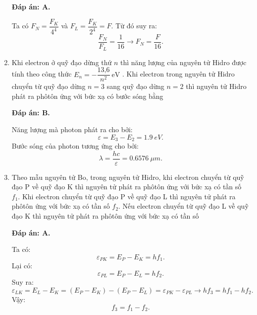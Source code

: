 \begin{enumerate}[label=\bfseries Câu \arabic*:]
	\loigiai
	{		\textbf{Đáp án: A.}
		
Ta có $ F_{N} = \dfrac{F_{K}}{4^{4}} $ và $ F_{L} = \dfrac{F_{K}}{2^{4}} = F $. Từ đó suy ra:
$$
	\dfrac{F_{N}}{F_{L}} = \dfrac{1}{16} \rightarrow F_{N} = \dfrac{F}{16}.
$$
		
	}
	
	\item {} 
		\cauhoi
	{Khi electron ở quỹ đạo dừng thứ $n$ thì năng lượng của nguyên tử Hidro được tính theo công thức $E_n=-\dfrac{\text{13,6}}{n^2}\ \text{eV}$  . Khi electron trong nguyên tử Hidro chuyển từ quỹ đạo dừng $n = 3$ sang quỹ đạo dừng $n = 2$ thì nguyên tử Hidro phát ra phôtôn ứng với bức xạ có bước sóng bằng
	}
	
	\loigiai
	{		\textbf{Đáp án: B.}
		
Năng lượng mà photon phát ra cho bởi:
$$
	\varepsilon = E_{3} - E_{2} = \SI{1,9}{eV}.
$$
Bước sóng của photon tương ứng cho bởi:
$$
	\lambda = \dfrac{hc}{\varepsilon} = \SI{0,6576}{\mu m}.
$$
	}
	
	\item {} 
		\cauhoi
	{Theo mẫu nguyên tử Bo, trong nguyên tử Hidro, khi electron chuyển từ quỹ đạo P về quỹ đạo K thì nguyên tử phát ra phôtôn ứng với bức xạ có tần số $f_1$. Khi electron chuyển từ quỹ đạo P về quỹ đạo L thì nguyên tử phát ra phôtôn ứng với bức xạ có tần số $f_2$. Nếu electron chuyển từ quỹ đạo L về quỹ đạo K thì nguyên tử phát ra phôtôn ứng với bức xạ có tần số
	}
	
	\loigiai
	{		\textbf{Đáp án: A.}
		
Ta có:
$$
	\varepsilon_{PK} = E_{P} - E_{K} = hf_{1}.
$$
Lại có:
$$
	\varepsilon_{PL} = E_{P} - E_{L} = hf_{2}.
$$
Suy ra:
$$
	\varepsilon_{LK} = E_{L} - E_{K} = (E_{P} - E_{K}) - (E_{P} - E_{L}) = \varepsilon_{PK} - \varepsilon_{PL} \rightarrow hf_{3} = hf_{1} - hf_{2}.
$$
Vậy:
$$
	f_{3} = f_{1} - f_{2}.
$$
		
}
\end{enumerate}
